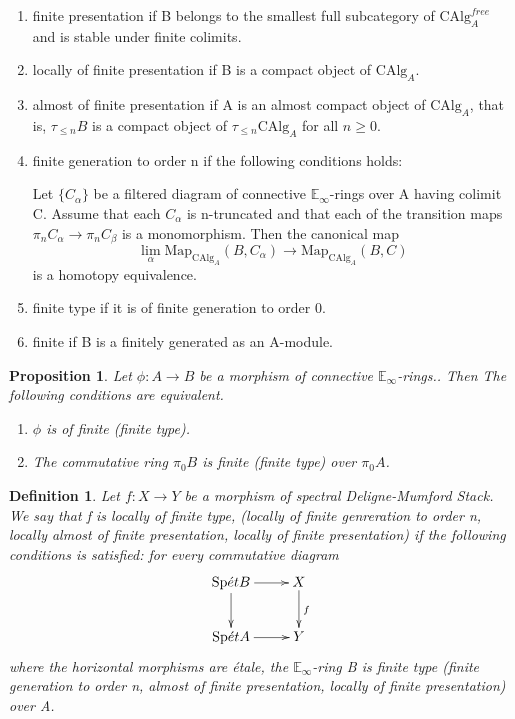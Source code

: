 \documentclass[12pt]{article}
\newtheorem{proposition}[theorem]{Proposition}
\theoremstyle{thry}
\newtheorem{definition}[theorem]{Definition}
\def  \CAlg     {\mathrm{CAlg}}
\def  \Map      {\mathrm{Map}}
\def  \Spet     {\mathrm{Sp}\acute{e}t}
\def  \be       {\mathbb{E}}
\begin{document}
\begin{enumerate}
	
 \item finite presentation if B belongs to the smallest full subcategory of $\CAlg_{A}^{free}$ and is stable under finite colimits.  
 \item locally of finite presentation if B is a compact object of $\CAlg_A$.  
 
 \item almost of finite presentation if A is an almost compact object of $\CAlg_A$, that is,  $\tau_{\leq n}B$ is a compact object of $\tau_{\leq n}\CAlg_A$ for all $n \geq 0$. 
 
 \item  finite generation to order n if the following conditions holds:

Let $\{C_{\alpha}\}$ be a filtered diagram of connective $\be_{\infty}$-rings over A having colimit C. Assume that each $C_{\alpha}$ is n-truncated and that each of the transition maps $\pi_n C_{\alpha} \to \pi_n C_{\beta}$ is a monomorphism. Then the canonical map
$$
\lim_{\alpha} \Map_{\CAlg_A}(B, C_{\alpha}) \to \Map_{\CAlg_A}(B, C)
$$ 
is a homotopy equivalence.

\item  finite type if it is of  finite generation to order 0.  

\item  finite  if B is a finitely generated as an A-module.



\end{enumerate}
\begin{proposition} \cite[Proposition 2.7.2.1, Proposition 4.1.1.3]{lu-SAG}
	Let $\phi: A \to B$ be a morphism of connective $\be_{\infty}$-rings.. Then The following conditions are equivalent.
	\begin{enumerate}
		\item  $\phi$ is of finite (finite type).
		\item  The commutative ring $\pi_0 B$ is finite (finite type) over $\pi_0 A$.
	\end{enumerate}
	
\end{proposition}




\begin{definition}\cite[Definition 4.2.0.1]{lu-SAG}
	Let $f: X \to Y$ be a morphism of spectral Deligne-Mumford Stack. We say that f is   locally of finite type, (locally of finite genreration to order n, locally almost of finite presentation, locally of finite presentation) if the following conditions is satisfied: for every   commutative diagram
	$$
	\xymatrix{
		\Spet B \ar[r]  \ar[d]  &  X \ar[d]^{f} \\
		\Spet A  \ar[r]   &   Y   \\	
	}
	$$
	where the horizontal morphisms are \'etale, the $\be_{\infty}$-ring B is finite type (finite generation to order n, almost of finite presentation, locally of finite presentation) over A.
\end{definition}
\end{document}
